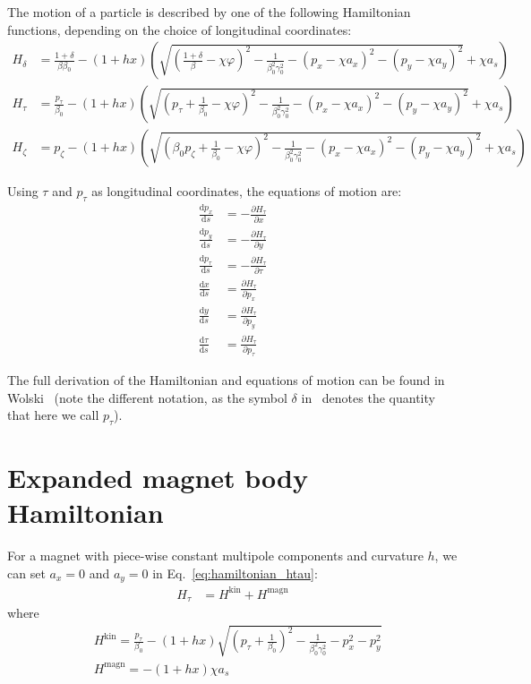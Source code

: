 The motion of a particle is described by one of the following Hamiltonian functions,
depending on the choice of longitudinal coordinates:
\begin{align}
 H_\delta   &= \frac{1+\delta}{\beta\beta_0} - (1+h x) \left(
      \sqrt{ \left(\frac{1+\delta}{\beta}-\chi\varphi\right)^2
           - \frac{1}{\beta_0^2\gamma_0^2}
           - (p_x - \chi a_x)^2
           - (p_y - \chi a_y)^2}
       + \chi a_s
    \right) \\
 H_\tau   &= \frac{p_\tau}{\beta_0} - (1+h x) \left(
      \sqrt{ \left(p_\tau+\frac{1}{\beta_0}-\chi\varphi\right)^2
           - \frac{1}{\beta_0^2\gamma_0^2}
           - (p_x - \chi a_x)^2
           - (p_y - \chi a_y)^2}
       + \chi a_s
    \right) \label{eq:hamiltonian_htau}\\
  H_\zeta &= p_\zeta - (1+h x) \left(
      \sqrt{ \left(\beta_0 p_\zeta+\frac{1}{\beta_0}-\chi\varphi\right)^2
           - \frac{1}{\beta_0^2\gamma_0^2}
           - (p_x - \chi a_x)^2
           - (p_y - \chi a_y)^2}
       + \chi a_s
    \right)
\end{align}

Using $\tau$ and $p_\tau$ as longitudinal coordinates, the equations of motion are:
\begin{align}
  \frac{\text{d} p_x}{\text{d}s} &=
    -\frac{\partial H_\tau}{\partial x} \\
  \frac{\text{d} p_y}{\text{d}s} &=
    -\frac{\partial H_\tau}{\partial y} \\
  \frac{\text{d} p_\tau}{\text{d}s} &=
    -\frac{\partial H_\tau}{\partial \tau} \\
  \frac{\text{d} x}{\text{d}s} &=
    \frac{\partial H_\tau}{\partial p_x} \\
  \frac{\text{d} y}{\text{d}s} &=
    \frac{\partial H_\tau}{\partial p_y} \\
  \frac{\text{d} \tau}{\text{d}s} &=
    \frac{\partial H_\tau}{\partial p_\tau}
\end{align}

The full derivation of the Hamiltonian and equations of motion can be found in
Wolski~\cite{wolski2014beam} (note the different notation, as the symbol $\delta$
in~\cite{wolski2014beam} denotes the quantity that here we call $p_\tau$).

\section{Expanded magnet body Hamiltonian}

For a magnet with piece-wise constant multipole components and curvature $h$, we can
set $a_x = 0$ and $a_y = 0$ in Eq.~\eqref{eq:hamiltonian_htau}:
\begin{align}
 H_\tau   &= H^\text{kin} + H^\text{magn}
\end{align}
where
\begin{align}
  &H^\text{kin} = \frac{p_\tau}{\beta_0} - (1+h x) \sqrt{ \left(p_\tau+\frac{1}{\beta_0}\right)^2
           - \frac{1}{\beta_0^2\gamma_0^2}
           - p_x^2
           - p_y^2} \label{eq:hamilt_kinetic_part}\\
  &H^\text{magn} = -(1+h x) \chi a_s
\end{align}

